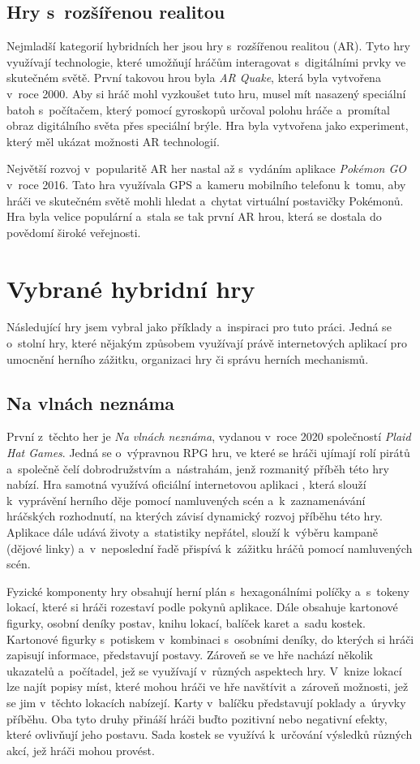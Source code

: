 \subsection{Hry s~rozšířenou realitou}
Nejmladší kategorií hybridních her jsou hry s~rozšířenou realitou (AR). Tyto hry využívají technologie, které umožňují hráčům interagovat s~digitálními prvky ve skutečném světě. První takovou hrou byla \textit{AR Quake}, která byla vytvořena v~roce 2000. Aby si hráč mohl vyzkoušet tuto hru, musel mít nasazený speciální batoh s~počítačem, který pomocí gyroskopů určoval polohu hráče a~promítal obraz digitálního světa přes speciální brýle. Hra byla vytvořena jako experiment, který měl ukázat možnosti AR technologií. \cite{ar_history}

Největší rozvoj v~popularitě AR her nastal až s~vydáním aplikace \textit{Pokémon GO} v~roce 2016. Tato hra využívala GPS a~kameru mobilního telefonu k~tomu, aby hráči ve skutečném světě mohli hledat a~chytat virtuální postavičky Pokémonů. Hra byla velice populární a~stala se tak první AR hrou, která se dostala do povědomí široké veřejnosti.

\section{Vybrané hybridní hry}
Následující hry jsem vybral jako příklady a~inspiraci pro tuto práci. Jedná se o~stolní hry, které nějakým způsobem využívají právě internetových aplikací pro umocnění herního zážitku, organizaci hry či správu herních mechanismů.

\subsection{Na vlnách neznáma}
První z~těchto her je \textit{Na vlnách neznáma}, vydanou v~roce 2020 společností \textit{Plaid Hat Games}. Jedná se o~výpravnou RPG hru, ve které se hráči ujímají rolí pirátů a~společně čelí dobrodružstvím a~nástrahám, jenž rozmanitý příběh této hry nabízí. Hra samotná využívá oficiální internetovou aplikaci \cite{forgotten_waters_app}, která slouží k~vyprávění herního děje pomocí namluvených scén a~k~zaznamenávání hráčských rozhodnutí, na kterých závisí dynamický rozvoj příběhu této hry. Aplikace dále udává životy a~statistiky nepřátel, slouží k~výběru kampaně (dějové linky) a~v~neposlední řadě přispívá k~zážitku hráčů pomocí namluvených scén.

Fyzické komponenty hry obsahují herní plán s~hexagonálními políčky a~s~tokeny lokací, které si hráči rozestaví podle pokynů aplikace. Dále obsahuje kartonové figurky, osobní deníky postav, knihu lokací, balíček karet a~sadu kostek. Kartonové figurky s~potiskem v~kombinaci s~osobními deníky, do kterých si hráči zapisují informace, představují postavy. Zároveň se ve hře nachází několik ukazatelů a~počítadel, jež se využívají v~různých aspektech hry. V~knize lokací lze najít popisy míst, které mohou hráči ve hře navštívit a~zároveň možnosti, jež se jim v~těchto lokacích nabízejí. Karty v~balíčku představují poklady a~úryvky příběhu. Oba tyto druhy přináší hráči buďto pozitivní nebo negativní efekty, které ovlivňují jeho postavu. Sada kostek se využívá k~určování výsledků různých akcí, jež hráči mohou provést.

